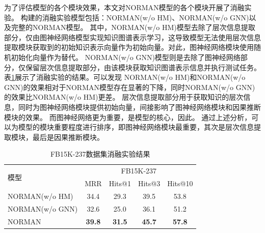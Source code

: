\documentclass[algorithmlist, AutoFakeBold, AutoFakeSlant, figurelist, tablelist, nomlist, engineering]{seuthesix}
\begin{document}
为了评估模型的各个模块效果，本文对NORMAN模型的各个模块开展了消融实验。
构建的消融实验模型包括：NORMAN(w/o HM)、NORMAN(w/o GNN)以及完整的NORMAN模型。
其中，NORMAN(w/o HM)模型去除了层次信息提取部分，仅由图神经网络模型实现知识图谱表示学习，这导致模型无法使用层次信息提取模块获取到的初始知识表示向量作为初始向量。对此，图神经网络模块使用随机初始化向量作为替代。
NORMAN(w/o GNN)模型则是去除了图神经网络部分，仅保留层次信息提取部分，由该模块获取知识图谱表示信息并执行测试任务。
表\ref{Experiment1_ablation}展示了消融实验的结果。可以发现
NORMAN(w/o HM)和NORMAN(w/o GNN)的效果相对于NORMAN模型存在显著的下降，同时NORMAN(w/o GNN)的效果比NORMAN(w/o HM)更差。
层次信息提取部分用于获取知识的层次信息，同时为图神经网络模块提供初始向量，间接影响了图神经网络模块和因果推断模块的效果。
而图神经网络更为重要，是模型的核心，因此。
通过上述分析，可以为模型的模块重要程度进行排序，即图神经网络模块最重要，其次是层次信息提取模块，最后是因果推断模块。
\begin{table}[]
  \centering
  \begin{tabular*}{0.95\textwidth}{@{\extracolsep{\fill}}lcccc}
  \toprule[1pt]
  \multirow{2}{*}{模型} & \multicolumn{4}{c}{FB15K-237} \\
    & MRR & Hits@1 & Hits@3 & Hits@10 \\ \hline
  NORMAN(w/o HM) & 34.4 & 29.3 & 39.5 & 53.8 \\
  NORMAN(w/o GNN) & 32.6 & 25.0 & 36.1 & 51.2 \\
  NORMAN & \textbf{39.8} & \textbf{31.5} & \textbf{45.7} & \textbf{57.8} \\
  \bottomrule[1pt]
  \end{tabular*}
  \caption{FB15K-237数据集消融实验结果}
  \label{Experiment1_ablation}
\end{table}
\end{document}
